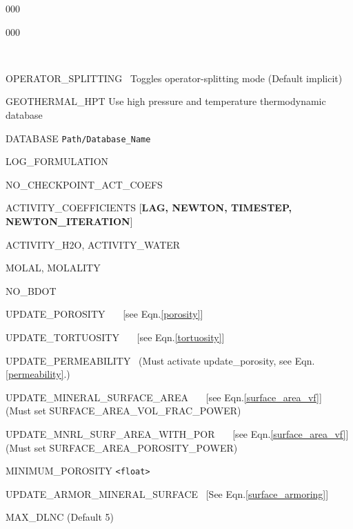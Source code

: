 \begin{deflist}{000}
\begin{deflist}{000}
\item [\keyend]
~\\
\item [OPERATOR\_SPLITTING] \ Toggles operator-splitting mode (Default implicit)
~\\
\item[GEOTHERMAL\_HPT] Use high pressure and temperature thermodynamic database
\item[DATABASE] {\tt Path/Database\_Name}
\item[LOG\_FORMULATION]
\item[NO\_CHECKPOINT\_ACT\_COEFS]
\item[ACTIVITY\_COEFFICIENTS] [{\bf LAG, NEWTON, TIMESTEP, NEWTON\_ITERATION}]
\item[ACTIVITY\_H2O, ACTIVITY\_WATER]
\item[MOLAL, MOLALITY]
\item[NO\_BDOT] 
\item[UPDATE\_POROSITY]  \ \ \ [see Eqn.\eqref{porosity}]
\item[UPDATE\_TORTUOSITY]  \ \ \ [see Eqn.\eqref{tortuosity}]
\item[UPDATE\_PERMEABILITY] \ (Must activate update\_porosity, see Eqn.\eqref{permeability}.)
\item[UPDATE\_MINERAL\_SURFACE\_AREA] \ \ \ [see Eqn.\eqref{surface_area_vf}]\\
(Must set SURFACE\_AREA\_VOL\_FRAC\_POWER)
\item[UPDATE\_MNRL\_SURF\_AREA\_WITH\_POR] \ \ \ [see Eqn.\eqref{surface_area_vf}]\\
(Must set SURFACE\_AREA\_POROSITY\_POWER)
\item[MINIMUM\_POROSITY] {\tt <float>}
\item[UPDATE\_ARMOR\_MINERAL\_SURFACE] \ [See Eqn.\eqref{surface_armoring}]
\item[MAX\_DLNC] \rm (Default 5)

~\\


\end{deflist}
\end{deflist}
